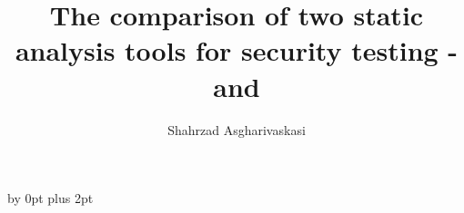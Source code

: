 \documentclass[]{upb_cs_thesis} %
\title{The comparison of two static analysis tools for security testing - \cognicryptsast{} and \codyze{}}
\author{Shahrzad Asgharivaskasi}
\begin{document}
{}\baselineskip \advance\parskip by 0pt plus 2pt
\sloppy
\let\cleardoublepage\clearpage

\break
\vspace*{\fill}
\begin{abstract}
	
\end{abstract}
\acresetall
\vspace*{\fill}
\emptypage

\tableofcontents %




\newpage
{}




\appendix

\end{document}
